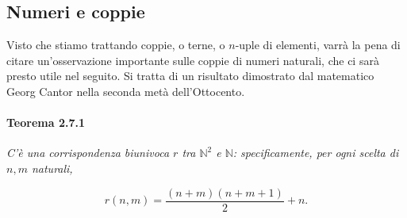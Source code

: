 \subsection{Numeri e coppie}

Visto che stiamo trattando coppie, o terne, o $n$-uple di elementi, varrà la pena
di citare un'osservazione importante sulle coppie di numeri naturali, che ci sarà
presto utile nel seguito. Si tratta di un risultato dimostrato dal matematico
Georg Cantor nella seconda metà dell'Ottocento.

\paragraph{Teorema 2.7.1}
\textit{C'è una corrispondenza biunivoca $r$ tra ${\mathbb{N}}^2$ e $\mathbb{N}$:
    specificamente, per ogni scelta di $n,m$ naturali,}

\[
    r(n,m) = \frac{(n+m)(n+m+1)}{2} + n.
\]

